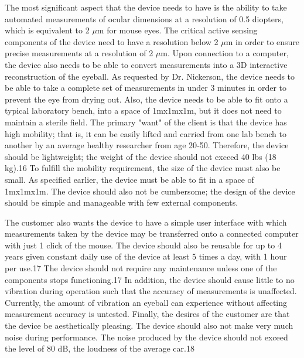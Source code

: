 \documentclass{article}
\begin{document}
The most significant aspect that the device needs to have is the ability to take automated measurements of ocular dimensions at a resolution of 0.5 diopters, which is equivalent to 2 $\mu$m for mouse eyes. The critical active sensing components of the device need to have a resolution below 2 $\mu$m in order to ensure precise measurements at a resolution of 2 $\mu$m. Upon connection to a computer, the device also needs to be able to convert measurements into a 3D interactive reconstruction of the eyeball. As requested by Dr. Nickerson, the device needs to be able to take a complete set of measurements in under 3 minutes in order to prevent the eye from drying out. Also, the device needs to be able to fit onto a typical laboratory bench, into a space of 1mx1mx1m, but it does not need to maintain a sterile field.      
The primary "want" of the client is that the device has high mobility; that is, it can be easily lifted and carried from one lab bench to another by an average healthy researcher from age 20‐50. Therefore, the device should be lightweight; the weight of the device should not exceed 40 lbs (18 kg).16 To fulfill the mobility requirement, the size of the device must also be small. As specified earlier, the device must be able to fit in a space of 1mx1mx1m. The device should also not be cumbersome; the design of the device should be simple and manageable with few external components.

The customer also wants the device to have a simple user interface with which measurements taken by the device may be transferred onto a connected computer with just 1 click of the mouse. The device should also be reusable for up to 4 years given constant daily use of the device at least 5 times a day, with 1 hour per use.17 The device should not require any maintenance unless one of the components stops functioning.17 In addition, the device should cause little to no vibration during operation such that the accuracy of measurements is unaffected. Currently, the amount of vibration an eyeball can experience without affecting measurement accuracy is untested. Finally, the desires of the customer are that the device be aesthetically pleasing. The device should also not make very much noise during performance. The noise produced by the device should not exceed the level of 80 dB, the loudness of the average car.18  
\end{document}
